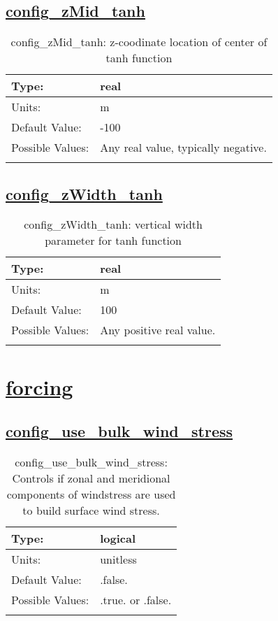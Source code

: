 \subsection[config\_zMid\_tanh]{\hyperref[sec:nm_tab_vmix_tanh]{config\_zMid\_tanh}}
\label{subsec:nm_sec_config_zMid_tanh}
\begin{center}
\begin{longtable}{| p{2.0in} || p{4.0in} |}
    \hline
    Type: & real \\
    \hline
    Units: & \si{m} \\
    \hline
    Default Value: & -100 \\
    \hline
    Possible Values: & Any real value, typically negative. \\
    \hline
    \caption{config\_zMid\_tanh: z-coodinate location of center of tanh function}
\end{longtable}
\end{center}
\subsection[config\_zWidth\_tanh]{\hyperref[sec:nm_tab_vmix_tanh]{config\_zWidth\_tanh}}
\label{subsec:nm_sec_config_zWidth_tanh}
\begin{center}
\begin{longtable}{| p{2.0in} || p{4.0in} |}
    \hline
    Type: & real \\
    \hline
    Units: & \si{m} \\
    \hline
    Default Value: & 100 \\
    \hline
    Possible Values: & Any positive real value. \\
    \hline
    \caption{config\_zWidth\_tanh: vertical width parameter for tanh function}
\end{longtable}
\end{center}
\section[forcing]{\hyperref[sec:nm_tab_forcing]{forcing}}
\label{sec:nm_sec_forcing}
\subsection[config\_use\_bulk\_wind\_stress]{\hyperref[sec:nm_tab_forcing]{config\_use\_bulk\_wind\_stress}}
\label{subsec:nm_sec_config_use_bulk_wind_stress}
\begin{center}
\begin{longtable}{| p{2.0in} || p{4.0in} |}
    \hline
    Type: & logical \\
    \hline
    Units: & \si{unitless} \\
    \hline
    Default Value: & .false. \\
    \hline
    Possible Values: & .true. or .false. \\
    \hline
    \caption{config\_use\_bulk\_wind\_stress: Controls if zonal and meridional components of windstress are used to build surface wind stress.}
\end{longtable}
\end{center}
